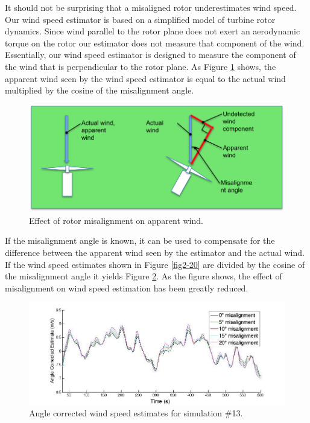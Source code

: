 It should not be surprising that a misaligned rotor underestimates wind speed. Our wind speed estimator is based on a simplified model of turbine rotor dynamics. Since wind parallel to the rotor plane does not exert an aerodynamic torque on the rotor our estimator does not measure that component of the wind. Essentially, our wind speed estimator is designed to measure the component of the wind that is perpendicular to the rotor plane. As Figure \ref{fig2-22} shows, the apparent wind seen by the wind speed estimator is equal to the actual wind multiplied by the cosine of the misalignment angle.

\begin{figure}[htbp]
	\centering
		\includegraphics[width=\textwidth]{Figures/ch2Figures/fig2-22.png}
		
	\caption{Effect of rotor misalignment on apparent wind.}
	\label{fig2-22}
\end{figure}

If the misalignment angle is known, it can be used to compensate for the difference between the apparent wind seen by the estimator and the actual wind. If the wind speed estimates shown in Figure \ref{fig2-20} are divided by the cosine of the misalignment angle it yields Figure \ref{fig2-23}. As the figure shows, the effect of misalignment on wind speed estimation has been greatly reduced. 


\begin{figure}[htbp]
	\centering
	\includegraphics[width = \linewidth]{Figures/ch2Figures/fig2-23.jpg}
		
	\caption{Angle corrected wind speed estimates for simulation \#13.}
	\label{fig2-23}
\end{figure}


